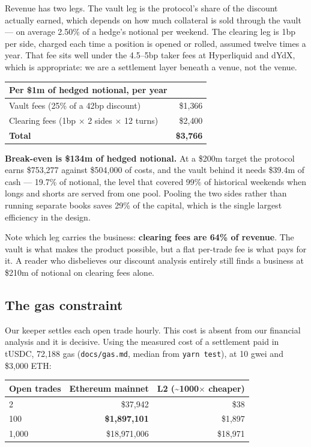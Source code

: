 \documentclass[11pt,a4paper]{article}
\begin{document}
Revenue has two legs. The vault leg is the protocol's share of the discount actually earned, which
depends on how much collateral is sold through the vault — on average 2.50\% of a hedge's notional
per weekend. The clearing leg is 1bp per side, charged each time a position is opened or rolled,
assumed twelve times a year. That fee sits well under the 4.5--5bp taker fees at Hyperliquid and
dYdX, which is appropriate: we are a settlement layer beneath a venue, not the venue.

\begin{center}
\begin{tabular}{@{}lr@{}}
\toprule
\textbf{Per \$1m of hedged notional, per year} & \\
\midrule
Vault fees (25\% of a 42bp discount) & \$1{,}366 \\
Clearing fees (1bp $\times$ 2 sides $\times$ 12 turns) & \$2{,}400 \\
\midrule
\textbf{Total} & \textbf{\$3{,}766} \\
\bottomrule
\end{tabular}
\end{center}

\textbf{Break-even is \$134m of hedged notional.} At a \$200m target the protocol earns \$753{,}277
against \$504{,}000 of costs, and the vault behind it needs \$39.4m of cash — 19.7\% of notional,
the level that covered 99\% of historical weekends when longs and shorts are served from one pool.
Pooling the two sides rather than running separate books saves 29\% of the capital, which is the
single largest efficiency in the design.

Note which leg carries the business: \textbf{clearing fees are 64\% of revenue}. The vault is what
makes the product possible, but a flat per-trade fee is what pays for it. A reader who disbelieves
our discount analysis entirely still finds a business at \$210m of notional on clearing fees alone.

\subsection{The gas constraint}

Our keeper settles each open trade hourly. This cost is absent from our financial analysis and it is
decisive. Using the measured cost of a settlement paid in tUSDC, 72,188 gas (\texttt{docs/gas.md},
median from \texttt{yarn test}), at 10 gwei and \$3,000 ETH:

\begin{center}
\begin{tabular}{@{}lrr@{}}
\toprule
\textbf{Open trades} & \textbf{Ethereum mainnet} & \textbf{L2 (\textasciitilde1000\(\times\) cheaper)} \\
\midrule
2 & \$37,942 & \$38 \\
100 & \textbf{\$1,897,101} & \$1,897 \\
1,000 & \$18,971,006 & \$18,971 \\
\bottomrule
\end{tabular}
\end{center}
\end{document}
